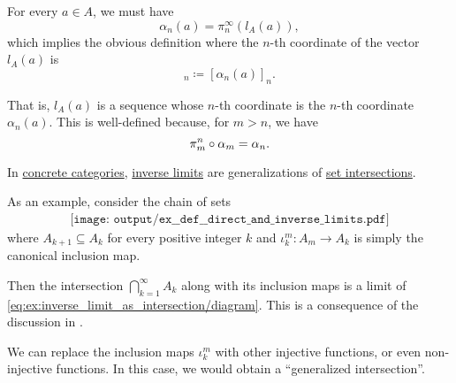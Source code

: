 \begin{example}
\begin{thmenum}
    For every \( a \in A \), we must have
    \begin{equation*}
      \alpha_n(a) = \pi_n^\infty(l_A(a)),
    \end{equation*}
    which implies the obvious definition where the \( n \)-th coordinate of the vector \( l_A(a) \) is
    \begin{equation*}
      [l_A(a)]_n \coloneqq [\alpha_n(a)]_n.
    \end{equation*}

    That is, \( l_A(a) \) is a sequence whose \( n \)-th coordinate is the \( n \)-th coordinate \( \alpha_n(a) \). This is well-defined because, for \( m > n \), we have
    \begin{equation*}
      \pi_m^n \bincirc \alpha_m = \alpha_n.
    \end{equation*}

     In \hyperref[def:concrete_category]{concrete categories}, \hyperref[def:direct_and_inverse_limits/inverse]{inverse limits} are generalizations of \hyperref[thm:zfc_existence_theorems/arbitrary_intersection]{set intersections}.

    As an example, consider the chain of sets
    \begin{equation}\label{eq:ex:inverse_limit_as_intersection/diagram}
      \begin{aligned}
        \texttt{[image: output/ex\_\_def\_\_direct\_and\_inverse\_limits.pdf]}
      \end{aligned}
    \end{equation}
    where \( A_{k+1} \subseteq A_k \) for every positive integer \( k \) and \( \iota_k^m: A_m \to A_k \) is simply the canonical inclusion map.

    Then the intersection \( \bigcap_{k=1}^\infty A_k \) along with its inclusion maps is a limit of \eqref{eq:ex:inverse_limit_as_intersection/diagram}. This is a consequence of the discussion in .

    We can replace the inclusion maps \( \iota_k^m \) with other injective functions, or even non-injective functions. In this case, we would obtain a \enquote{generalized intersection}.
  \end{thmenum}
\end{example}

